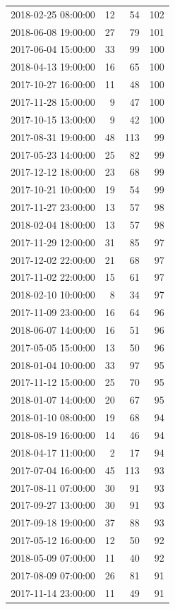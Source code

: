 \begin{tabular}{lrrr}
2018-02-25 08:00:00 & 12 & 54 & 102 \\
2018-06-08 19:00:00 & 27 & 79 & 101 \\
2017-06-04 15:00:00 & 33 & 99 & 100 \\
2018-04-13 19:00:00 & 16 & 65 & 100 \\
2017-10-27 16:00:00 & 11 & 48 & 100 \\
2017-11-28 15:00:00 & 9 & 47 & 100 \\
2017-10-15 13:00:00 & 9 & 42 & 100 \\
2017-08-31 19:00:00 & 48 & 113 & 99 \\
2017-05-23 14:00:00 & 25 & 82 & 99 \\
2017-12-12 18:00:00 & 23 & 68 & 99 \\
2017-10-21 10:00:00 & 19 & 54 & 99 \\
2017-11-27 23:00:00 & 13 & 57 & 98 \\
2018-02-04 18:00:00 & 13 & 57 & 98 \\
2017-11-29 12:00:00 & 31 & 85 & 97 \\
2017-12-02 22:00:00 & 21 & 68 & 97 \\
2017-11-02 22:00:00 & 15 & 61 & 97 \\
2018-02-10 10:00:00 & 8 & 34 & 97 \\
2017-11-09 23:00:00 & 16 & 64 & 96 \\
2018-06-07 14:00:00 & 16 & 51 & 96 \\
2017-05-05 15:00:00 & 13 & 50 & 96 \\
2018-01-04 10:00:00 & 33 & 97 & 95 \\
2017-11-12 15:00:00 & 25 & 70 & 95 \\
2018-01-07 14:00:00 & 20 & 67 & 95 \\
2018-01-10 08:00:00 & 19 & 68 & 94 \\
2018-08-19 16:00:00 & 14 & 46 & 94 \\
2018-04-17 11:00:00 & 2 & 17 & 94 \\
2017-07-04 16:00:00 & 45 & 113 & 93 \\
2017-08-11 07:00:00 & 30 & 91 & 93 \\
2017-09-27 13:00:00 & 30 & 91 & 93 \\
2017-09-18 19:00:00 & 37 & 88 & 93 \\
2017-05-12 16:00:00 & 12 & 50 & 92 \\
2018-05-09 07:00:00 & 11 & 40 & 92 \\
2017-08-09 07:00:00 & 26 & 81 & 91 \\
2017-11-14 23:00:00 & 11 & 49 & 91 \\

\end{tabular}
